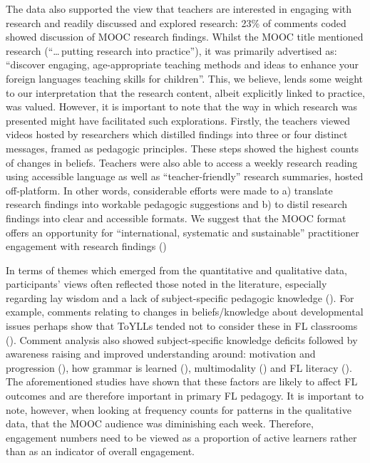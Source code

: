 \documentclass[output=paper]{langscibook}
\begin{document}
The data also supported the \citet{MarsdenKasprowicz2017} view that teachers are interested in engaging with research and readily discussed and explored research: 23\% of comments coded showed discussion of MOOC research findings. Whilst the MOOC title mentioned research (``\ldots\,putting research into practice''), it was primarily advertised as: ``discover engaging, age-appropriate teaching methods and ideas to enhance your foreign languages teaching skills for children''. This, we believe, lends some weight to our interpretation that the research content, albeit explicitly linked to practice, was valued. However, it is important to note that the way in which research was presented might have facilitated such explorations. Firstly, the teachers viewed videos hosted by researchers which distilled findings into three or four distinct messages, framed as pedagogic principles. These steps showed the highest counts of changes in beliefs. Teachers were also able to access a weekly research reading using accessible language as well as ``teacher-friendly'' research summaries, hosted off-platform. In other words, considerable efforts were made to a) translate research findings into workable pedagogic suggestions and b) to distil research findings into clear and accessible formats. We suggest that the MOOC format offers an opportunity for ``international, systematic and sustainable'' practitioner engagement with research findings (\citealt[613]{MarsdenKasprowicz2017})

In terms of themes which emerged from the quantitative and qualitative data, participants’ views often reflected those noted in the literature, especially regarding lay wisdom and a lack of subject-specific pedagogic knowledge (\citealt{Barrios2014,GartonEtAl2011}). For example, comments relating to changes in beliefs/knowledge about developmental issues perhaps show that ToYLLs tended not to consider these in FL classrooms (\citealt{Hild2017,Rea-DickinsGardner2000}). Comment analysis also showed subject-specific knowledge deficits followed by awareness raising and improved understanding around: motivation and progression (\citealt{CourtneyEtAl2017}), how grammar is learned (\citealt{GrahamEtAl2017,KocamanCansiz2012,Roothoft2017}), multimodality (\citealt{MitchellMyles2019,MylesMitchell2012,Porter2020}) and FL literacy (\citealt{Porter2020}). The aforementioned studies have shown that these factors are likely to affect FL outcomes and are therefore important in primary FL pedagogy. It is important to note, however, when looking at frequency counts for patterns in the qualitative data, that the MOOC audience was diminishing each week. Therefore, engagement numbers need to be viewed as a proportion of active learners rather than as an indicator of overall engagement.
\end{document}
